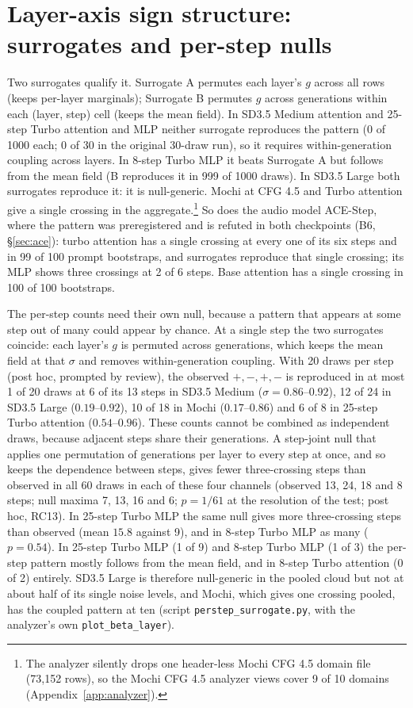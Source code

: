 \section{Layer-axis sign structure: surrogates and per-step nulls}\label{supp:beta}
Two surrogates qualify it. Surrogate A permutes each layer's $g$ across all rows (keeps per-layer marginals); Surrogate B permutes $g$ across generations within each (layer, step) cell (keeps the mean field). In SD3.5 Medium attention and 25-step Turbo attention and MLP neither surrogate reproduces the pattern (0 of 1000 each; 0 of 30 in the original 30-draw run), so it requires within-generation coupling across layers. In 8-step Turbo MLP it beats Surrogate A but follows from the mean field (B reproduces it in 999 of 1000 draws). In SD3.5 Large both surrogates reproduce it: it is null-generic. Mochi at CFG 4.5 and Turbo attention give a single crossing in the aggregate.\footnote{The analyzer silently drops one header-less Mochi CFG 4.5 domain file (73{,}152 rows), so the Mochi CFG 4.5 analyzer views cover 9 of 10 domains (Appendix~\ref{app:analyzer}).} So does the audio model ACE-Step, where the pattern was preregistered and is refuted in both checkpoints (B6, \S\ref{sec:ace}): turbo attention has a single crossing at every one of its six steps and in 99 of 100 prompt bootstraps, and surrogates reproduce that single crossing; its MLP shows three crossings at 2 of 6 steps. Base attention has a single crossing in 100 of 100 bootstraps.

The per-step counts need their own null, because a pattern that appears at some step out of many could appear by chance. At a single step the two surrogates coincide: each layer's $g$ is permuted across generations, which keeps the mean field at that $\sigma$ and removes within-generation coupling. With 20 draws per step (post hoc, prompted by review), the observed $+,-,+,-$ is reproduced in at most 1 of 20 draws at 6 of its 13 steps in SD3.5 Medium ($\sigma=0.86$--$0.92$), 12 of 24 in SD3.5 Large ($0.19$--$0.92$), 10 of 18 in Mochi ($0.17$--$0.86$) and 6 of 8 in 25-step Turbo attention ($0.54$--$0.96$). These counts cannot be combined as independent draws, because adjacent steps share their generations. A step-joint null that applies one permutation of generations per layer to every step at once, and so keeps the dependence between steps, gives fewer three-crossing steps than observed in all 60 draws in each of these four channels (observed 13, 24, 18 and 8 steps; null maxima 7, 13, 16 and 6; $p=1/61$ at the resolution of the test; post hoc, RC13). In 25-step Turbo MLP the same null gives more three-crossing steps than observed (mean $15.8$ against 9), and in 8-step Turbo MLP as many ($p=0.54$). In 25-step Turbo MLP (1 of 9) and 8-step Turbo MLP (1 of 3) the per-step pattern mostly follows from the mean field, and in 8-step Turbo attention (0 of 2) entirely. SD3.5 Large is therefore null-generic in the pooled cloud but not at about half of its single noise levels, and Mochi, which gives one crossing pooled, has the coupled pattern at ten (script \texttt{perstep\_surrogate.py}, with the analyzer's own \texttt{plot\_beta\_layer}).

